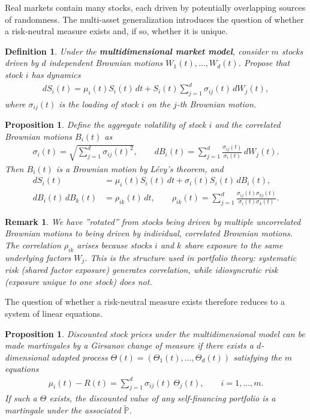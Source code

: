 \documentclass{report}
\theoremstyle{spacedplain}
\newtheorem{proposition}[theorem]{Proposition}
\theoremstyle{spaceddefinition}
\newtheorem{definition}[theorem]{Definition}
\theoremstyle{spacedremark}
\newtheorem{remark}[theorem]{Remark}
\begin{document}
Real markets contain many stocks, each driven by potentially overlapping sources of randomness. The multi-asset generalization introduces the question of whether a risk-neutral measure exists and, if so, whether it is unique.

\begin{definition}
Under the \textbf{multidimensional market model}, consider $m$ stocks driven by $d$ independent Brownian motions $W_1(t), \ldots, W_d(t)$. Propose that stock $i$ has dynamics
\begin{align}
    dS_i(t) = \mu_i(t)S_i(t)\,dt + S_i(t)\sum_{j=1}^d \sigma_{ij}(t)\,dW_j(t),
\end{align}
where $\sigma_{ij}(t)$ is the loading of stock $i$ on the $j$-th Brownian motion.
\end{definition}

\begin{proposition}
Define the aggregate volatility of stock $i$ and the correlated Brownian motions $B_i(t)$ as
\begin{align}
    \sigma_i(t) = \sqrt{\sum_{j=1}^d \sigma_{ij}(t)^2}, \qquad dB_i(t) = \sum_{j=1}^d \frac{\sigma_{ij}(t)}{\sigma_i(t)}\,dW_j(t).
\end{align}
Then $B_i(t)$ is a Brownian motion by L\'evy's theorem, and
\begin{align}
    dS_i(t) &= \mu_i(t)S_i(t)\,dt + \sigma_i(t)S_i(t)\,dB_i(t), \\
    dB_i(t)\,dB_k(t) &= \rho_{ik}(t)\,dt, \qquad \rho_{ik}(t) = \sum_{j=1}^d \frac{\sigma_{ij}(t)\sigma_{kj}(t)}{\sigma_i(t)\sigma_k(t)}.
\end{align}
\end{proposition}

\begin{remark}
We have ''rotated'' from stocks being driven by multiple uncorrelated Brownian motions to being driven by individual, correlated Brownian motions. The correlation $\rho_{ik}$ arises because stocks $i$ and $k$ share exposure to the same underlying factors $W_j$. This is the structure used in portfolio theory: systematic risk (shared factor exposure) generates correlation, while idiosyncratic risk (exposure unique to one stock) does not.
\end{remark}

The question of whether a risk-neutral measure exists therefore reduces to a system of linear equations.

\begin{proposition}
Discounted stock prices under the multidimensional model can be made martingales by a Girsanov change of measure if there exists a $d$-dimensional adapted process $\Theta(t) = (\Theta_1(t), \ldots, \Theta_d(t))$ satisfying the $m$ equations
\begin{align}
    \mu_i(t) - R(t) = \sum_{j=1}^d \sigma_{ij}(t)\,\Theta_j(t), \qquad i = 1, \ldots, m.
\end{align}
If such a $\Theta$ exists, the discounted value of any self-financing portfolio is a martingale under the associated $\widetilde{\mathbb{P}}$.
\end{proposition}
\end{document}
